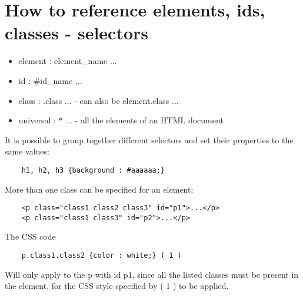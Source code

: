 \documentclass[a4paper,11pt]{book}
\begin{document}
\section{How to reference elements, ids, classes - selectors}
	\begin{itemize}
	\item element : element\_name { ... }
	\item id      : \#id\_name { ... }
	\item class   : .class { ... } - can also be element.class { ... }
	\item universal : * { ... } - all the elements of an HTML document
	\end{itemize}
	It is possible to group together different selectors and set their
	properties to the same values:
	\begin{verbatim}
	h1, h2, h3 {background : #aaaaaa;}
	\end{verbatim}
	More than one class can be specified for an element:
	\begin{verbatim}
	<p class="class1 class2 class3" id="p1">...</p>
	<p class="class1 class3" id="p2">...</p>
	\end{verbatim}
	The CSS code
	\begin{verbatim}
	p.class1.class2 {color : white;} ( 1 )
	\end{verbatim}
	Will only apply to the p with id p1, since all the listed classes
	must be present in the element, for the CSS style specified by ( 1 )
	to be applied.
\end{document}
